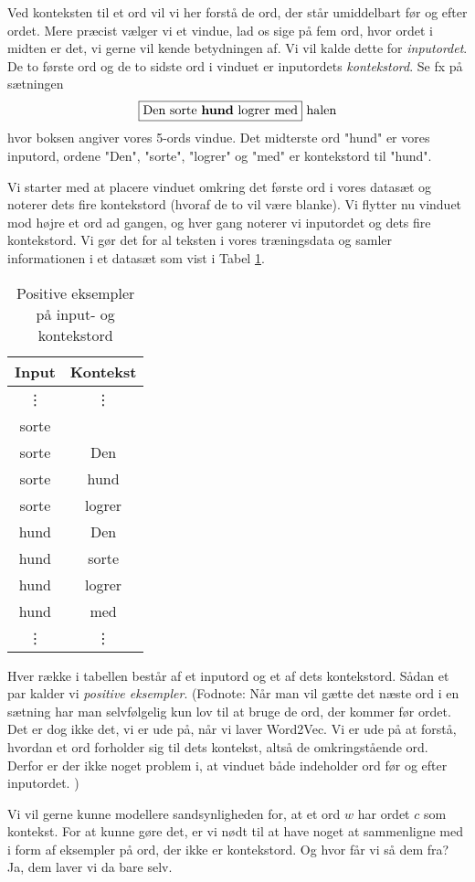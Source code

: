 \documentclass{article}
\begin{document}
Ved konteksten til et ord vil vi her forstå de ord, der står umiddelbart før og efter ordet. Mere præcist vælger vi et vindue, lad os sige på fem ord, hvor ordet i midten er det, vi gerne vil kende betydningen af. Vi vil kalde dette for \emph{inputordet}. De to første ord  og de to sidste ord i vinduet er inputordets \emph{kontekstord}.  Se fx på sætningen
$$\text{\fbox{Den sorte \textbf{hund} logrer med} halen}$$
hvor boksen angiver vores 5-ords vindue. Det midterste ord  "hund" er vores inputord, ordene "Den", "sorte", "logrer" og "med" er kontekstord til "hund". 

Vi starter med at placere vinduet omkring det første ord i vores datasæt og noterer dets fire kontekstord (hvoraf de to vil være blanke). Vi flytter nu vinduet mod højre et ord ad gangen, og hver gang noterer vi inputordet og  dets fire kontekstord. Vi gør det for al teksten i vores træningsdata og samler informationen i et datasæt som vist i Tabel \ref{tab:positiv}.
\begin{table}[h]
\begin{center}
\begin{tabular}{cc}
{Input} & {Kontekst} \\
\hline
\vdots & \vdots  \\
sorte &  \\
sorte & Den  \\
sorte & hund \\
sorte & logrer \\
hund & Den\\
hund & sorte \\
hund & logrer \\
hund & med \\
\vdots & \vdots
\end{tabular}
\end{center}
\caption{Positive eksempler på input- og kontekstord}\label{tab:positiv}
\end{table}
Hver række i tabellen består af et inputord og et af dets kontekstord. Sådan et par kalder vi \emph{positive eksempler}. (Fodnote: Når man vil gætte det næste ord i en sætning har man selvfølgelig kun lov til at bruge de ord, der kommer før ordet. Det er dog ikke det, vi er ude på, når vi laver Word2Vec. Vi er ude på at forstå, hvordan et ord forholder sig til dets kontekst, altså de omkringstående ord. Derfor er der ikke noget problem i, at vinduet både indeholder ord før og efter inputordet. )

Vi vil gerne kunne modellere sandsynligheden for, at et ord $w$ har ordet $c$ som kontekst. For at kunne gøre det, er vi nødt til at have noget at sammenligne med i form af eksempler på ord, der ikke er kontekstord. Og hvor får vi så dem fra? Ja, dem laver vi da bare selv.
\end{document}
